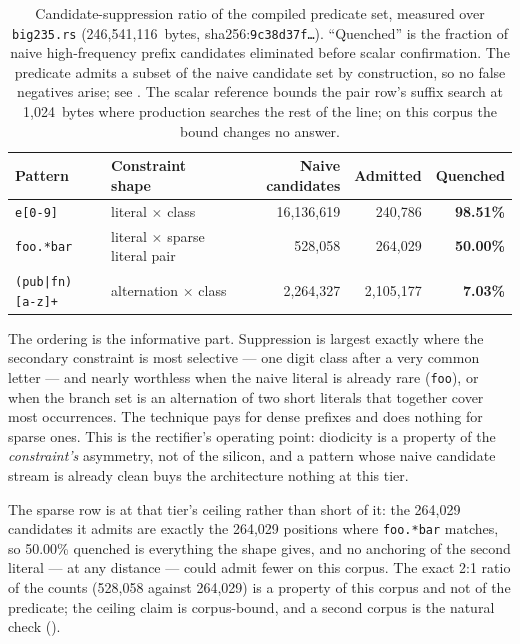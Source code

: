 \documentclass[11pt,letterpaper]{article}
\begin{document}
\begin{table}[htbp]
\centering
\footnotesize
\caption{Candidate-suppression ratio of the compiled predicate set,
measured over \texttt{big235.rs} (246{,}541{,}116~bytes,
sha256:\texttt{9c38d37f\ldots}). ``Quenched'' is the fraction of naive
high-frequency prefix candidates eliminated before scalar confirmation.
The predicate admits a subset of the naive candidate set by construction,
so no false negatives arise; see . The scalar reference
bounds the pair row's suffix search at 1{,}024~bytes where production
searches the rest of the line; on this corpus the bound changes no answer.}
\label{tab:dio}
\begin{tabular}{@{}llrrr@{}}
\toprule
\textbf{Pattern} & \textbf{Constraint shape}
  & \textbf{Naive candidates} & \textbf{Admitted} & \textbf{Quenched} \\
\midrule
\texttt{e[0-9]}          & literal $\times$ class
  & 16{,}136{,}619 & 240{,}786    & \textbf{98.51\%} \\
\texttt{foo.*bar}        & literal $\times$ sparse literal pair
  & 528{,}058      & 264{,}029    & \textbf{50.00\%} \\
\texttt{(pub|fn) [a-z]+} & alternation $\times$ class
  & 2{,}264{,}327  & 2{,}105{,}177 & \textbf{7.03\%} \\
\bottomrule
\end{tabular}
\end{table}

The ordering is the informative part. Suppression is largest exactly where
the secondary constraint is most selective --- one digit class after a very
common letter --- and nearly worthless when the naive literal is already rare
(\texttt{foo}), or when the branch set is an alternation of two short
literals that together cover most occurrences. The technique pays for dense
prefixes and does nothing for sparse ones. This is the rectifier's operating
point: diodicity is a property of the \emph{constraint's} asymmetry, not of
the silicon, and a pattern whose naive candidate stream is already clean
buys the architecture nothing at this tier.

The sparse row is at that tier's ceiling rather than short of it: the
264{,}029 candidates it admits are exactly the 264{,}029 positions where
\texttt{foo.*bar} matches, so 50.00\% quenched is everything the shape
gives, and no anchoring of the second literal --- at any distance --- could
admit fewer on this corpus. The exact 2:1 ratio of the counts
(528{,}058 against 264{,}029) is a property of this corpus and not of the
predicate; the ceiling claim is corpus-bound, and a second corpus is the
natural check ().
\end{document}
